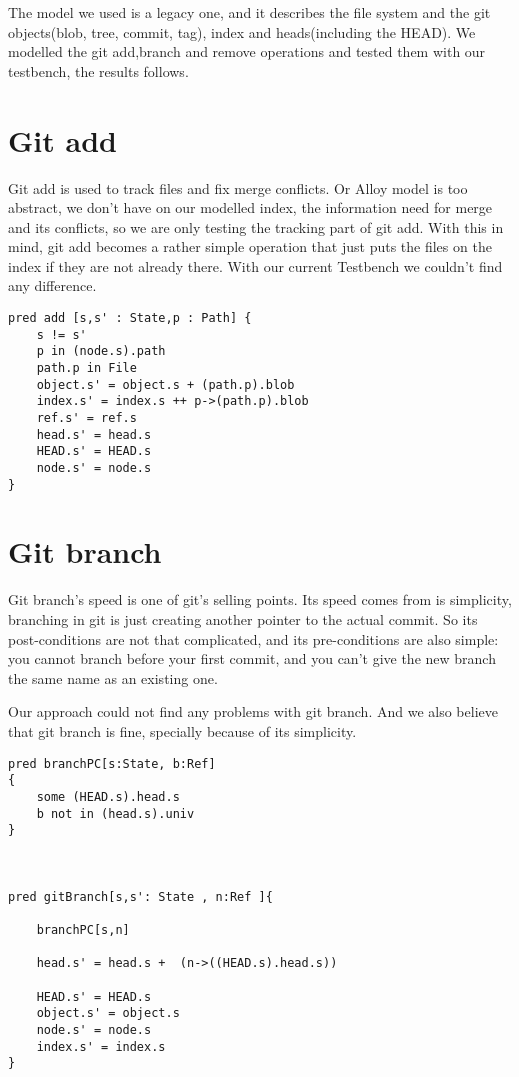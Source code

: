 
The model we used is a legacy one, and it describes the file system and the git objects(blob, tree, commit, tag), index and heads(including the HEAD).
We modelled the git add,branch and remove operations and tested them with our testbench, the results follows.

\section{Git add}

Git add is used to track files and fix merge conflicts. Or Alloy model is too abstract, we don't have on our modelled index, the information need for merge and its conflicts, so we are only testing the tracking part of git add. With this in mind, git add becomes a rather simple operation that just puts the files on the index if they are not already there. With our current Testbench we couldn't find any difference.

\begin{lstlisting}[caption=Predicate add]
pred add [s,s' : State,p : Path] {
	s != s'
	p in (node.s).path
	path.p in File
	object.s' = object.s + (path.p).blob
	index.s' = index.s ++ p->(path.p).blob
 	ref.s' = ref.s
	head.s' = head.s
	HEAD.s' = HEAD.s
	node.s' = node.s
}
\end{lstlisting}
\newpage
\section{Git branch}
Git branch's speed is one of git's selling points. Its speed comes from is simplicity, branching in git is just creating another pointer to the actual commit. So its post-conditions are not that complicated, and its pre-conditions are also simple: you cannot branch before your first commit, and you can't give the new branch the same name as an existing one.


Our approach could not find any problems with git branch. And we also believe that git branch is fine, specially because of its simplicity.


\begin{lstlisting}[caption=Predicate branch]
pred branchPC[s:State, b:Ref]
{
	some (HEAD.s).head.s
	b not in (head.s).univ
}



pred gitBranch[s,s': State , n:Ref ]{

	branchPC[s,n]

	head.s' = head.s +  (n->((HEAD.s).head.s))
	
	HEAD.s' = HEAD.s	
	object.s' = object.s
	node.s' = node.s
	index.s' = index.s
}

\end{lstlisting}

